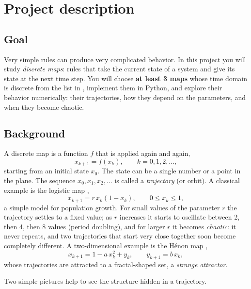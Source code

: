 \documentclass[11pt,a4paper]{article}
\begin{document}
\section*{Project description}

\subsection*{Goal}
Very simple rules can produce very complicated behavior. In this project you
will study \emph{discrete maps}: rules that take the current state of a
system and give its state at the next time step. You will choose
\textbf{at least 3 maps} whose time domain is discrete from the list in
\cite{list}, implement them in Python, and explore their behavior
numerically: their trajectories, how they depend on the parameters, and when
they become chaotic.

\subsection*{Background}
A discrete map is a function $f$ that is applied again and again,
\begin{equation*}
  x_{k+1} = f(x_k), \qquad k = 0, 1, 2, \dots,
\end{equation*}
starting from an initial state $x_0$. The state can be a single number or a
point in the plane. The sequence $x_0, x_1, x_2, \dots$ is called a
\emph{trajectory} (or orbit). A classical example is the logistic map
\cite{may},
\begin{equation*}
  x_{k+1} = r\,x_k(1 - x_k), \qquad 0 \le x_k \le 1,
\end{equation*}
a simple model for population growth. For small values of the parameter $r$
the trajectory settles to a fixed value; as $r$ increases it starts to
oscillate between 2, then 4, then 8 values (period doubling), and for larger
$r$ it becomes \emph{chaotic}: it never repeats, and two trajectories that
start very close together soon become completely different. A two-dimensional
example is the H\'enon map \cite{henon},
\begin{equation*}
  x_{k+1} = 1 - a\,x_k^2 + y_k, \qquad y_{k+1} = b\,x_k,
\end{equation*}
whose trajectories are attracted to a fractal-shaped set, a \emph{strange
attractor}.

Two simple pictures help to see the structure hidden in a trajectory.
\end{document}
